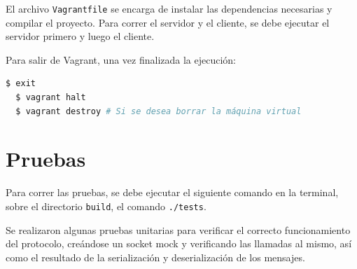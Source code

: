 \documentclass[titlepage,a4paper]{article}
\begin{document}
El archivo \texttt{Vagrantfile} se encarga de instalar las dependencias necesarias y compilar el proyecto. Para correr el servidor y el cliente, se debe ejecutar el servidor primero y luego el cliente.

Para salir de Vagrant, una vez finalizada la ejecución:

\begin{lstlisting}[language=sh,caption=Salir de Vagrant, captionpos=b]
  $ exit
  $ vagrant halt
  $ vagrant destroy # Si se desea borrar la máquina virtual
\end{lstlisting}

\section{Pruebas}
Para correr las pruebas, se debe ejecutar el siguiente comando en la terminal, sobre el directorio \texttt{build}, el comando \texttt{./tests}.

Se realizaron algunas pruebas unitarias para verificar el correcto funcionamiento del protocolo, creándose un socket mock y verificando las llamadas al mismo, así como el resultado de la serialización y deserialización de los mensajes.
\end{document}
